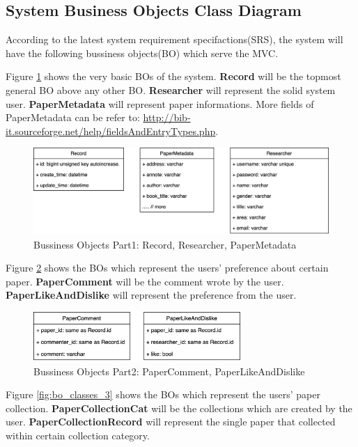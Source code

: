 \subsection{System Business Objects Class Diagram}

According to the latest system requirement specifactions(SRS),
the system will have the following bussiness objects(BO) which serve the MVC.

Figure \ref{fig:bo_classes_1} shows the very basic BOs of the system.
\textbf{Record} will be the topmost general BO above any other BO.
\textbf{Researcher} will represent the solid system user.
\textbf{PaperMetadata} will represent paper informations.
More fields of PaperMetadata can be refer to:
\url{http://bib-it.sourceforge.net/help/fieldsAndEntryTypes.php}.


\begin{figure}[t]
	\centering
	\includegraphics[width=\textwidth]{./img/bo_classes_1.png}
	\caption{Bussiness Objects Part1: Record, Researcher, PaperMetadata}

	\label{fig:bo_classes_1}
\end{figure}


Figure \ref{fig:bo_classes_2} shows the BOs which represent the users' preference about certain paper.
\textbf{PaperComment} will be the comment wrote by the user.
\textbf{PaperLikeAndDislike} will represent the preference from the user.

\begin{figure}[t]
	\centering
	\includegraphics[width=0.7\textwidth]{./img/bo_classes_2.png}
	\caption{Bussiness Objects Part2: PaperComment, PaperLikeAndDislike}

	\label{fig:bo_classes_2}
\end{figure}

Figure \ref{fig:bo_classes_3} shows the BOs which represent the users' paper collection.
\textbf{PaperCollectionCat} will be the collections which are created by the user.
\textbf{PaperCollectionRecord} will represent the single paper that collected within certain collection category.


